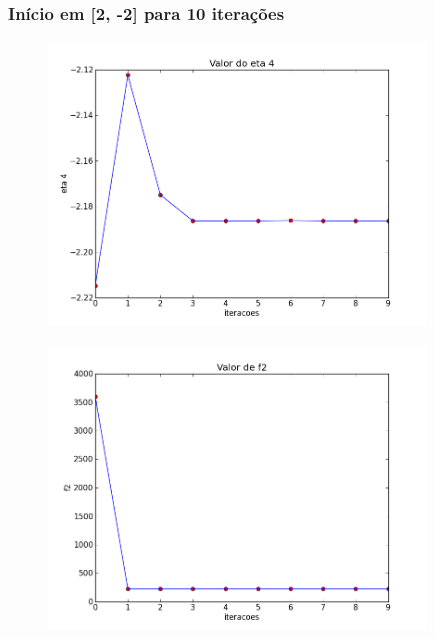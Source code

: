 \documentclass[12pt]{article}
\begin{document}
\clearpage
\subsubsection{Início em [2, -2] para 10 iterações}
\mbox{}

\begin{figure}[!h]
\begin{center}
\includegraphics[width=10cm]{2_2_eta_4.png}
\end{center}
\end{figure}

\begin{figure}[!h]
\begin{center}
\includegraphics[width=10cm]{2_2_f_2.png}
\end{center}
\end{figure}
\end{document}
